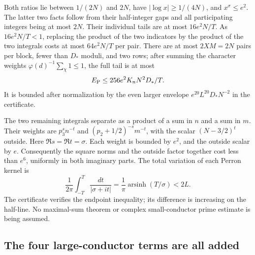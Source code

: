 \documentclass[11pt]{article}
\theoremstyle{definition}
\begin{document}
Both ratios lie between $1/(2N)$ and $2N$, have
$|\log x|\ge1/(4N)$, and $x^\sigma\le e^2$.
The latter two facts follow from their half-integer gaps and all
participating integers being at most $2N$.
Their individual tails are at most $16e^2N/T$.
As $16e^2N/T<1$, replacing the product of the two indicators by the
product of the two integrals costs at most $64e^2N/T$ per pair.
There are at most $2XM=2N$ pairs per block, fewer than $D_*$
moduli, and two rows; after summing the character weights
$\varphi(d)^{-1}\sum_\chi1\le1$, the full tail is at most
\begin{equation}\label{eq:switch-perron}
 E_{\rm P}\le256e^2K_nN^2D_*/T.
\end{equation}
It is bounded after normalization by the even larger envelope
$e^{20}L^{20}D_*N^{-2}$ in the certificate.

The two remaining integrals separate as a product of a sum in $n$
and a sum in $m$.  Their weights are
$p_3^s n^{-t}$ and $(p_2+1/2)^{-s}m^{-t}$, with the scalar
$(N-3/2)^t$ outside.  Here $\Re s=\Re t=\sigma$.
Each weight is bounded by $e^2$, and the outside scalar by $e$.
Consequently the square norms and the outside factor together cost
less than $e^6$, uniformly in both imaginary parts.
The total variation of each Perron kernel is
\[
 \frac1{2\pi}\int_{-T}^T\frac{dt}{|\sigma+it|}
 =\frac1\pi\operatorname{arsinh}(T/\sigma)<2L.
\]
The certificate verifies the endpoint inequality; its difference is
increasing on the half-line.  No maximal-sum theorem or complex
small-conductor prime estimate is being assumed.

\subsection{The four large-conductor terms are all added}
\end{document}
